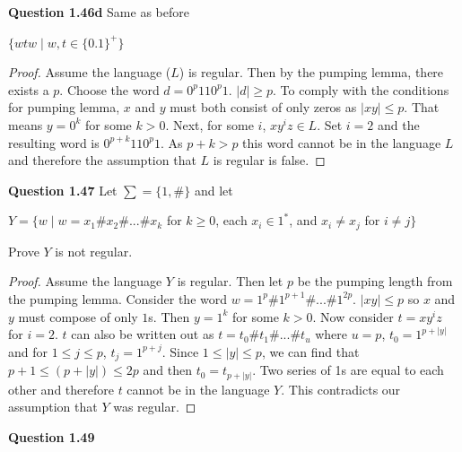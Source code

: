 \documentclass{article}
\begin{document}
    \textbf{Question 1.46d} Same as before
        \begin{center}
            $\{wtw \mid w,t \in \{0.1\}^+ \}$
        \end{center}
        \begin{proof}
            Assume the language ($L$) is regular. Then by the pumping lemma, there exists a $p$. Choose the word $d=0^p110^p1$. $|d|\geq p$. To comply with the conditions for pumping lemma, $x$ and $y$ must both consist of only zeros as $|xy|\leq p$. That means $y=0^k$ for some $k>0$. Next, for some $i$, $xy^iz\in L$. Set $i=2$ and the resulting word is $0^{p+k}110^p1$. As $p+k > p$ this word cannot be in the language $L$ and therefore the assumption that $L$ is regular is false.  
        \end{proof}
    \textbf{Question 1.47} Let $\sum = \{1,\#\}$ and let 
        \begin{center}
            $Y=\{w\mid w=x_1\#x_2\#...\#x_k $ for $ k \geq 0 $, each $ x_i\in 1^* $, and $ x_i\not= x_j $ for $ i\not= j \}$
        \end{center}
        Prove $Y$ is not regular.
        \begin{proof}
            Assume the language $Y$ is regular. Then let $p$ be the pumping length from the pumping lemma. Consider the word $w=1^p\#1^{p+1}\#...\#1^{2p}$. $|xy|\leq p$ so $x$ and $y$ must compose of only $1$s. Then $y=1^k$ for some $k>0$. Now consider $t = xy^iz$ for $i=2$. $t$ can also be written out as $t=t_0\#t_1\#...\#t_u$ where $u=p$, $t_0=1^{p+|y|}$ and for $1\leq j \leq p$, $t_j=1^{p+j}$. Since $1\leq |y|\leq p$, we can find that $p+1\leq (p+|y|) \leq 2p$ and then $t_0=t_{p+|y|}$. Two series of 1s are equal to each other and therefore $t$ cannot be in the language $Y$. This contradicts our assumption that $Y$ was regular.
        \end{proof}
    \noindent\textbf{Question 1.49}
\end{document}
